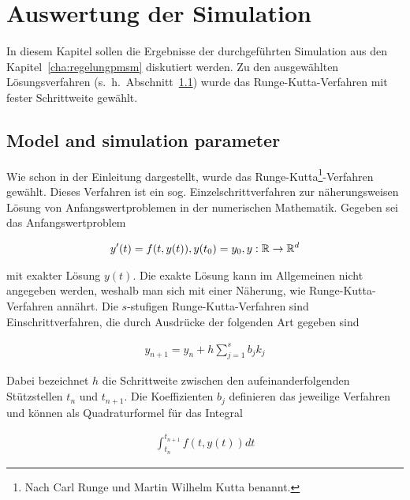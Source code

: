 
\chapter{Auswertung der Simulation}
\label{chap:ergebnisse-foc}

In diesem Kapitel sollen die Ergebnisse der durchgeführten Simulation aus den Kapitel~\ref{cha:regelungpmsm} diskutiert werden.
Zu den ausgewählten Lösungsverfahren (s.~h.~Abschnitt~\ref{sec:parameter}) wurde das Runge-Kutta-Verfahren mit fester Schrittweite gewählt.

\section{Model and simulation parameter}\label{sec:parameter}

Wie schon in der Einleitung dargestellt, wurde das Runge-Kutta\footnote{Nach Carl Runge und Martin Wilhelm Kutta benannt.}-Verfahren gewählt.
Dieses Verfahren ist ein sog. Einzelschrittverfahren zur näherungsweisen Lösung von Anfangswertproblemen in der numerischen Mathematik.
Gegeben sei das Anfangswertproblem

\begin{align}
	y'(t) = f(t,y(t)), y(t_{\mathrm{0}})=y_{\mathrm{0}}, y: \mathbb{R}\rightarrow\mathbb{R}^{d}
\end{align}

mit exakter Lösung $y(t)$.
Die exakte Lösung kann im Allgemeinen nicht angegeben werden, weshalb man sich mit einer Näherung, wie Runge-Kutta-Verfahren annährt.
Die $s$-stufigen Runge-Kutta-Verfahren sind Einschrittverfahren, die durch Ausdrücke der folgenden Art gegeben sind

\begin{align}
	y_{n+1} = y_n + h \sum_{j=1}^{s}{b_j k_j}
\end{align}

Dabei bezeichnet $h$ die Schrittweite zwischen den aufeinanderfolgenden Stützstellen $t_n$ und $t_{n+1}$.
Die Koeffizienten $b_j$ definieren das jeweilige Verfahren und können als Quadraturformel für das Integral

\begin{align}
	\int_{t_n}^{t_{n+1}}{f(t,y(t))dt}
\end{align}

